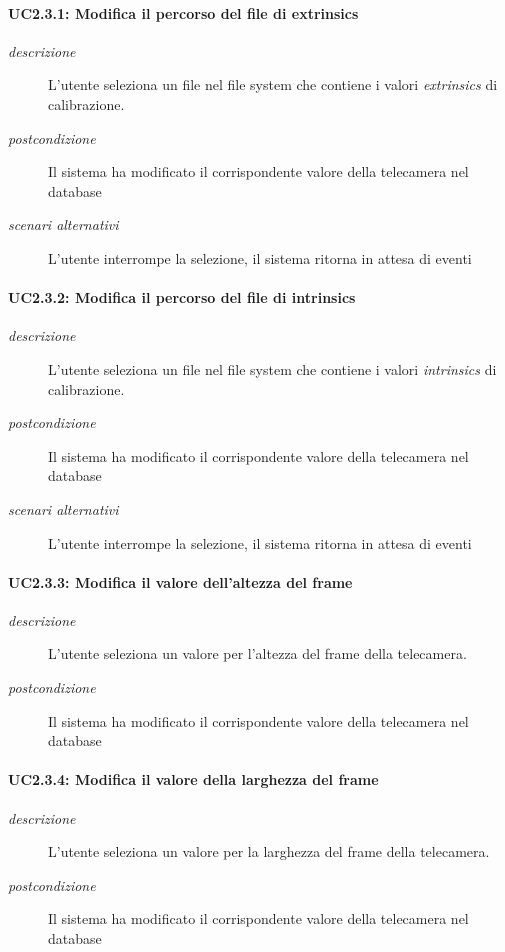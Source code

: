 \paragraph{UC2.3.1: Modifica il percorso del file di extrinsics}
\begin{description}
 \item[\em{descrizione}] L'utente seleziona un file nel file system che contiene i valori \textit{extrinsics} di calibrazione.
   \item[\em{postcondizione}] Il sistema ha modificato il corrispondente valore della telecamera nel database
  \item[\em{scenari alternativi}] L'utente interrompe la selezione, il sistema ritorna in attesa di eventi
 \end{description}

\paragraph{UC2.3.2: Modifica il percorso del file di intrinsics}
\begin{description}
 \item[\em{descrizione}] L'utente seleziona un file nel file system che contiene i valori \textit{intrinsics} di calibrazione.
   \item[\em{postcondizione}] Il sistema ha modificato il corrispondente valore della telecamera nel database
  \item[\em{scenari alternativi}] L'utente interrompe la selezione, il sistema ritorna in attesa di eventi
 \end{description}

\paragraph{UC2.3.3: Modifica il valore dell'altezza del frame}
\begin{description}
 \item[\em{descrizione}] L'utente seleziona un valore per l'altezza del frame della telecamera.
   \item[\em{postcondizione}] Il sistema ha modificato il corrispondente valore della telecamera nel database
 \end{description}
 
\paragraph{UC2.3.4: Modifica il valore della larghezza del frame}
\begin{description}
 \item[\em{descrizione}] L'utente seleziona un valore per la larghezza del frame della telecamera.
   \item[\em{postcondizione}] Il sistema ha modificato il corrispondente valore della telecamera nel database
 \end{description}
 
